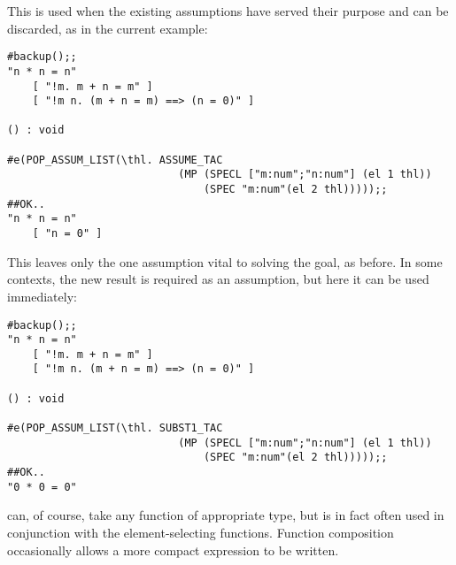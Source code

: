 \noindent This is used when the existing assumptions have served
their purpose and can be discarded, as in the current example:

\begin{session}\begin{verbatim}
#backup();;
"n * n = n"
    [ "!m. m + n = m" ]
    [ "!m n. (m + n = m) ==> (n = 0)" ]

() : void

#e(POP_ASSUM_LIST(\thl. ASSUME_TAC
                           (MP (SPECL ["m:num";"n:num"] (el 1 thl))
                               (SPEC "m:num"(el 2 thl)))));;
##OK..
"n * n = n"
    [ "n = 0" ]
\end{verbatim}\end{session}

\noindent This leaves only the one assumption vital to solving the goal,
as before. In some contexts, the new result is required as an assumption,
but here it can be used immediately:

\begin{session}\begin{verbatim}
#backup();;
"n * n = n"
    [ "!m. m + n = m" ]
    [ "!m n. (m + n = m) ==> (n = 0)" ]

() : void

#e(POP_ASSUM_LIST(\thl. SUBST1_TAC
                           (MP (SPECL ["m:num";"n:num"] (el 1 thl))
                               (SPEC "m:num"(el 2 thl)))));;
##OK..
"0 * 0 = 0"
\end{verbatim}\end{session}

\noindent {} can, of course,
take any function of appropriate
type, but is in fact often used in conjunction with the element-selecting
functions. Function composition occasionally allows a more
compact expression to be written.

